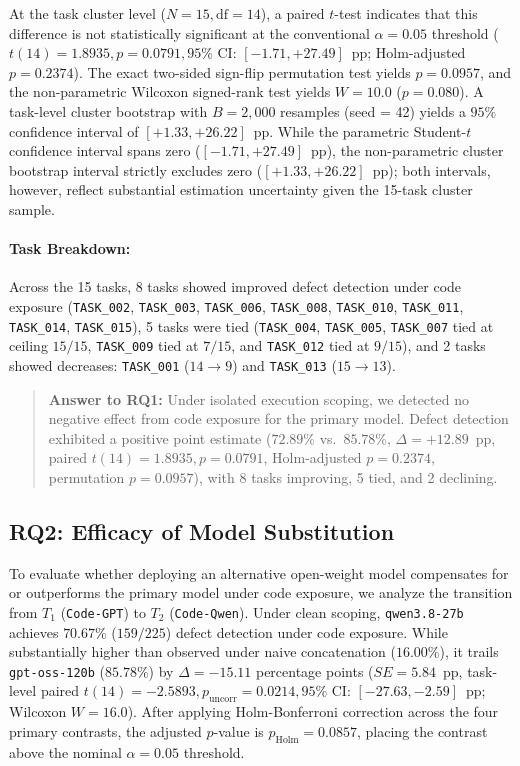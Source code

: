 \documentclass[11pt,a4paper]{article}
\begin{document}
At the task cluster level ($N=15, \text{df}=14$), a paired $t$-test indicates that this difference is not statistically significant at the conventional $\alpha = 0.05$ threshold ($t(14) = 1.8935, p = 0.0791, 95\%$ CI: $[-1.71, +27.49]$~pp; Holm-adjusted $p = 0.2374$). The exact two-sided sign-flip permutation test yields $p = 0.0957$, and the non-parametric Wilcoxon signed-rank test yields $W = 10.0$ ($p = 0.080$). A task-level cluster bootstrap with $B = 2{,}000$ resamples (seed = 42) yields a $95\%$ confidence interval of $[+1.33, +26.22]$~pp. While the parametric Student-$t$ confidence interval spans zero ($[-1.71, +27.49]$~pp), the non-parametric cluster bootstrap interval strictly excludes zero ($[+1.33, +26.22]$~pp); both intervals, however, reflect substantial estimation uncertainty given the 15-task cluster sample.

\paragraph{Task Breakdown:}
Across the 15 tasks, 8 tasks showed improved defect detection under code exposure (\texttt{TASK\_002}, \texttt{TASK\_003}, \texttt{TASK\_006}, \texttt{TASK\_008}, \texttt{TASK\_010}, \texttt{TASK\_011}, \texttt{TASK\_014}, \texttt{TASK\_015}), 5 tasks were tied (\texttt{TASK\_004}, \texttt{TASK\_005}, \texttt{TASK\_007} tied at ceiling $15/15$, \texttt{TASK\_009} tied at $7/15$, and \texttt{TASK\_012} tied at $9/15$), and 2 tasks showed decreases: \texttt{TASK\_001} ($14 \to 9$) and \texttt{TASK\_013} ($15 \to 13$).

\begin{quote}
\textbf{Answer to RQ1:} Under isolated execution scoping, we detected no negative effect from code exposure for the primary model. Defect detection exhibited a positive point estimate ($72.89\%$ vs.\ $85.78\%$, $\Delta = +12.89$~pp, paired $t(14) = 1.8935, p = 0.0791$, Holm-adjusted $p = 0.2374$, permutation $p = 0.0957$), with 8 tasks improving, 5 tied, and 2 declining.
\end{quote}

\subsection{RQ2: Efficacy of Model Substitution}
To evaluate whether deploying an alternative open-weight model compensates for or outperforms the primary model under code exposure, we analyze the transition from $T_1$ (\texttt{Code-GPT}) to $T_2$ (\texttt{Code-Qwen}).
Under clean scoping, \texttt{qwen3.8-27b} achieves $70.67\%$ ($159/225$) defect detection under code exposure. While substantially higher than observed under naive concatenation ($16.00\%$), it trails \texttt{gpt-oss-120b} ($85.78\%$) by $\Delta = -15.11$ percentage points ($SE = 5.84$~pp, task-level paired $t(14) = -2.5893, p_{\text{uncorr}} = 0.0214, 95\%$ CI: $[-27.63, -2.59]$~pp; Wilcoxon $W = 16.0$). After applying Holm-Bonferroni correction across the four primary contrasts, the adjusted $p$-value is $p_{\text{Holm}} = 0.0857$, placing the contrast above the nominal $\alpha = 0.05$ threshold.
\end{document}

